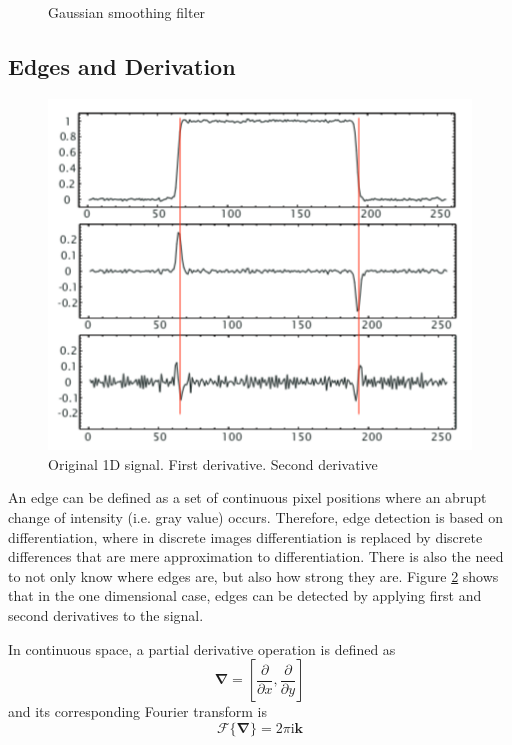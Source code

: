 \begin{figure}
		    \caption{Gaussian smoothing filter}
		    \label{fig:gauss_intro}
		\end{figure}




		\subsection{Edges and Derivation}
		\begin{figure}\label{fig:edges_intro}
			\centering
			\includegraphics[scale=0.8]{graphs/edges_intro.png}
			\caption{Original 1D signal. First derivative. Second derivative}
		\end{figure}
		An edge can be defined as a set of continuous pixel positions where an abrupt change of intensity (i.e. gray value) occurs. Therefore, edge detection is based on differentiation, where in discrete images differentiation is replaced by discrete differences that are mere approximation to differentiation. There is also the need to not only know where edges are, but also how strong they are. Figure \ref{fig:edges_intro} shows that in the one dimensional case, edges can be detected by applying first and second derivatives to the signal. 
		
		In continuous space, a partial derivative operation is defined as
		\begin{equation}
		 	\mathbf{\nabla} = \left[ \dfrac{\partial}{\partial x}, \dfrac{\partial}{\partial y} \right]
		\end{equation}
		and its corresponding Fourier transform is
		\begin{equation}
			\mathscr{F}\{\mathbf{\nabla}\} = 2 \pi \text{i} \mathbf{k}
		\end{equation}
		
